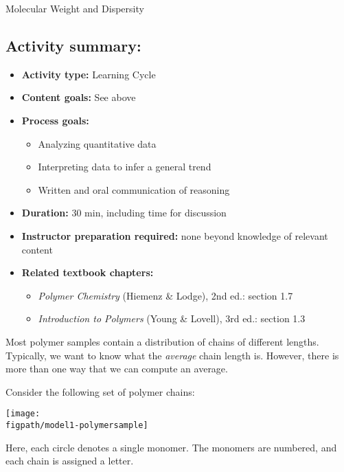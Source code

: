 \begin{activity}{Molecular Weight and Dispersity}
\begin{instructornotes}
	\subsection*{Activity summary:}
	\begin{itemize}
		\item \textbf{Activity type:} Learning Cycle
		\item \textbf{Content goals:} See above
		\item \textbf{Process goals:} %
			\begin{itemize}
				\item Analyzing quantitative data
				\item Interpreting data to infer a general trend
				\item Written and oral communication of reasoning
			\end{itemize}
		\item \textbf{Duration:} 30 min, including time for discussion
		\item \textbf{Instructor preparation required:} none beyond knowledge of relevant content
		\item \textbf{Related textbook chapters:}
			\begin{itemize}
				\item \emph{Polymer Chemistry} (Hiemenz \& Lodge), 2nd ed.: section 1.7
				\item \emph{Introduction to Polymers} (Young \& Lovell), 3rd ed.: section 1.3
			\end{itemize}
	\end{itemize}

\end{instructornotes}

\begin{model}
\label{\labelbase:mdl:MNandMW}

	Most polymer samples contain a distribution of chains of different lengths.  Typically, we want to know what the \emph{average} chain length is.  However, there is more than one way that we can compute an average.
	
	Consider the following set of polymer chains:
	
		\vspace{6pt}
		\centerline{\texttt{[image: \\figpath/model1-polymersample]}}
	
	Here, each circle denotes a single monomer.  The monomers are numbered, and each chain is assigned a letter.


\end{model}
\end{activity}
